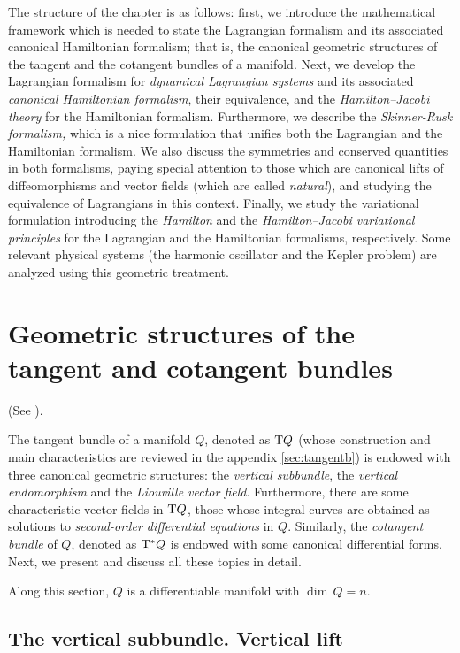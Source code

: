 \documentclass[12pt]{report}
\def\Tan{{\rm T}}
\begin{document}
The structure of the chapter is as follows: 
first, we introduce the mathematical framework which is needed 
to state the Lagrangian formalism and its associated canonical Hamiltonian formalism; 
that is, the canonical geometric structures of the tangent and the cotangent bundles of a manifold.
Next, we develop the Lagrangian formalism for {\sl dynamical Lagrangian systems}
and its associated {\sl canonical Hamiltonian formalism}, 
their equivalence, and the {\sl Hamilton--Jacobi theory}
for the Hamiltonian formalism.
Furthermore, we describe the {\sl Skinner-Rusk formalism,} which is
a nice formulation that unifies both the Lagrangian and the Hamiltonian formalism.
We also discuss the symmetries and conserved quantities in both formalisms,
paying special attention to those which are canonical lifts of diffeomorphisms and vector fields (which are called {\sl natural\/}),
and studying the equivalence of Lagrangians in this context.
Finally, we study the variational formulation introducing the {\sl Hamilton} and the {\sl Hamilton--Jacobi variational principles}
for the Lagrangian and the Hamiltonian formalisms, respectively.
Some relevant physical systems (the harmonic oscillator and the Kepler problem) are analyzed using this geometric treatment.



\section{Geometric structures of the tangent and cotangent bundles}
\protect\label{egft}


(See \cite{Cr-81,Cr-83b,CP-adg,dLe89,Ga-52,Go-69,Grif-72a,Grif-72b,klein,SCC-84}).

The tangent bundle of a manifold $Q$, denoted as   $\Tan Q$ (whose construction and main characteristics are reviewed in the appendix \ref{sec:tangentb})
is endowed with three canonical geometric structures:
the {\sl vertical subbundle}, the {\sl vertical endomorphism} and the {\sl Liouville vector field}.
Furthermore, there are some characteristic vector fields in $\Tan Q$,
those whose integral curves are obtained as solutions to 
{\sl second-order differential equations} in $Q$.
Similarly, the {\sl cotangent bundle} of $Q$, denoted as $\Tan^*Q$
is endowed with some canonical differential forms.
Next, we present and discuss all these topics in detail.

Along this section, $Q$ is a differentiable manifold with $\dim\,Q=n$.


\subsection{The vertical subbundle. Vertical lift}
\end{document}
